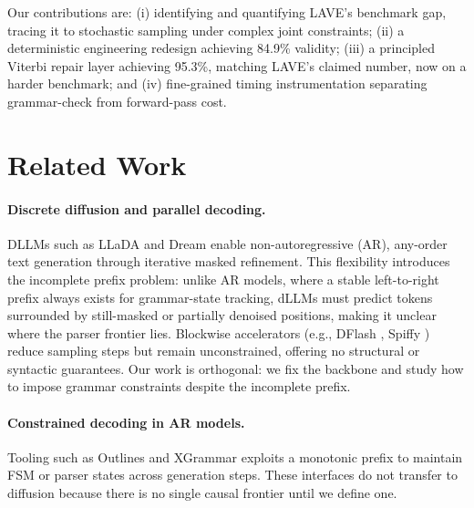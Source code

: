 Our contributions are: (i) identifying and quantifying LAVE's benchmark gap, tracing it to stochastic sampling under complex joint constraints; (ii) a deterministic engineering redesign achieving 84.9\% validity; (iii) a principled Viterbi repair layer achieving 95.3\%, matching LAVE's claimed number, now on a harder benchmark; and (iv) fine-grained timing instrumentation separating grammar-check from forward-pass cost.

\section{Related Work}
\label{sec:related}

\paragraph{Discrete diffusion and parallel decoding.}
DLLMs such as LLaDA \citep{llada} and Dream \citep{dream} enable non-autoregressive (AR), any-order text generation through iterative masked refinement. This flexibility introduces the incomplete prefix problem: unlike AR models, where a stable left-to-right prefix always exists for grammar-state tracking, dLLMs must predict tokens surrounded by still-masked or partially denoised positions, making it unclear where the parser frontier lies. Blockwise accelerators (e.g., DFlash \citep{chen2026dflashblockdiffusionflash}, Spiffy \citep{agrawal2026spiffymultiplyingdiffusionllm}) reduce sampling steps but remain unconstrained, offering no structural or syntactic guarantees. Our work is orthogonal: we fix the backbone and study how to impose grammar constraints despite the incomplete prefix.

\paragraph{Constrained decoding in AR models.}
Tooling such as Outlines \citep{outlines} and XGrammar \citep{dong2024xgrammar} exploits a monotonic prefix to maintain FSM or parser states across generation steps. These interfaces do not transfer to diffusion because there is no single causal frontier until we define one.

